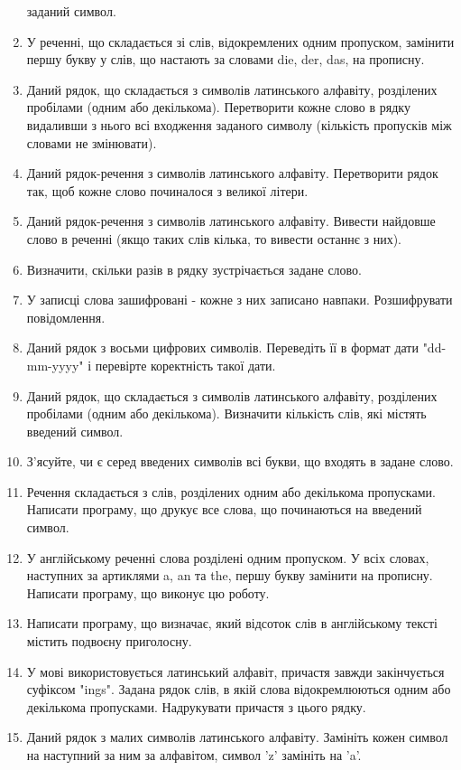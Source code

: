 \documentclass[]{article}
\begin{document}
\begin{enumerate}
  заданий символ.
\item
  У реченні, що складається зі слів, відокремлених одним пропуском,
  замінити першу букву у слів, що настають за словами die, der, das, на
  прописну.
\item
  Даний рядок, що складається з символів латинського алфавіту,
  розділених пробілами (одним або декількома). Перетворити кожне слово в
  рядку видаливши з нього всі входження заданого символу (кількість
  пропусків між словами не змінювати).
\item
  Даний рядок-речення з символів латинського алфавіту. Перетворити рядок
  так, щоб кожне слово починалося з великої літери.
\item
  Даний рядок-речення з символів латинського алфавіту. Вивести найдовше
  слово в реченні (якщо таких слів кілька, то вивести останнє з них).
\item
  Визначити, скільки разів в рядку зустрічається задане слово.
\item
  У записці слова зашифровані - кожне з них записано навпаки.
  Розшифрувати повідомлення.
\item
  Даний рядок з восьми цифрових символів. Переведіть її в формат дати
  "dd-mm-yyyy" і перевірте коректність такої дати.
\item
  Даний рядок, що складається з символів латинського алфавіту,
  розділених пробілами (одним або декількома). Визначити кількість слів,
  які містять введений символ.
\item
  З'ясуйте, чи є серед введених символів всі букви, що входять в задане
  слово.
\item
  Речення складається з слів, розділених одним або декількома
  пропусками. Написати програму, що друкує все слова, що починаються на
  введений символ.
\item
  У англійському реченні слова розділені одним пропуском. У всіх словах,
  наступних за артиклями a, an та the, першу букву замінити на прописну.
  Написати програму, що виконує цю роботу.
\item
  Написати програму, що визначає, який відсоток слів в англійському
  тексті містить подвоєну приголосну.
\item
  У мові використовується латинський алфавіт, причастя завжди
  закінчується суфіксом "ings". Задана рядок слів, в якій слова
  відокремлюються одним або декількома пропусками. Надрукувати причастя
  з цього рядку.
\item
  Даний рядок з малих символів латинського алфавіту. Замініть кожен
  символ на наступний за ним за алфавітом, символ 'z' замініть на 'a'.

\end{enumerate}
\end{document}
